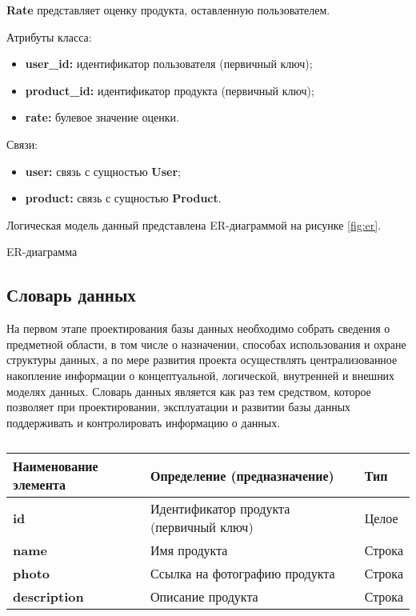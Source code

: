 \textbf{Rate} представляет оценку продукта, оставленную пользователем.

Атрибуты класса:
\begin{itemize}
	\item \textbf{user\_id:} идентификатор пользователя (первичный ключ);
	\item \textbf{product\_id:} идентификатор продукта (первичный ключ);
	\item \textbf{rate:} булевое значение оценки.
\end{itemize}

Связи:
\begin{itemize}
	\item \textbf{user:} связь с сущностью \textbf{User};
	\item \textbf{product:} связь с сущностью \textbf{Product}.
\end{itemize}

Логическая модель данный представлена ER-диаграммой на рисунке \ref{fig:er}.


\begin{image}
	\caption{ER-диаграмма}
	\label{fig:er}
\end{image}

\subsection{Словарь данных}

На первом этапе проектирования базы данных необходимо собрать сведения о предметной области, в том числе о назначении,
способах использования и охране структуры данных, а по мере развития проекта осуществлять централизованное накопление
информации о концептуальной, логической, внутренней и внешних моделях данных.
Словарь данных является как раз тем средством, которое позволяет при проектировании, эксплуатации и развитии базы
данных поддерживать и контролировать информацию о данных.

\begin{longtable}{|p{3.5cm}|p{5cm}|p{5cm}|}
	\caption{} \\
	\hline
	\textbf{Наименование элемента}
	& \textbf{Определение (предназначение)}
	& \textbf{Тип} \\ \hline
	\endhead
	\textbf{id} & Идентификатор продукта (первичный ключ) & Целое \\ \hline
	\textbf{name} & Имя продукта & Строка \\ \hline
	\textbf{photo} & Ссылка на фотографию продукта & Строка \\ \hline
	\textbf{description} & Описание продукта & Строка \\ \hline
\end{longtable}

